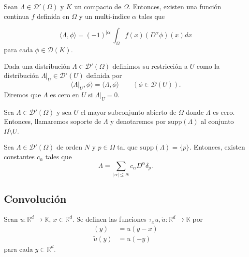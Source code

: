\begin{teorema}
Sean $\Lambda\in \mathcal{D}'(\Omega)$ y $K$ un compacto de $\Omega$. Entonces, existen una función continua $f$ definida en $\Omega$ y un multi-índice $\alpha$ tales que 

\begin{equation}
\langle \Lambda , \phi\rangle = (-1)^{\vert\alpha\vert} \int_{\Omega}f(x)(D^{\alpha}\phi )(x)dx
\end{equation}
para cada $\phi\in \mathcal{D}(K)$.
\end{teorema}

\begin{definicion}
Dada una distribución $\Lambda\in\mathcal{D}'(\Omega)$ definimos su restricción a $U$ como la distribución  $\Lambda|_{U}\in\mathcal{D}'(U)$ definida por 
\begin{equation}
\langle\Lambda |_{U},\phi\rangle = \langle \Lambda, \phi\rangle \qquad (\phi \in \mathcal{D}(U)).
\end{equation}
Diremos que $\Lambda$ es cero en $U$ si $\Lambda |_{U} = 0$.
\end{definicion}

\begin{definicion}
Sea $\Lambda\in\mathcal{D}'(\Omega)$ y sea $U$ el mayor subconjunto abierto de $\Omega$ donde $\Lambda$ es cero. Entonces, llamaremos soporte de $\Lambda$ y denotaremos por  $\mathrm{supp}({\Lambda})$ al conjunto $\Omega\setminus U$.

\end{definicion}

\begin{teorema}\label{thm:d02}
Sea $\Lambda\in \mathcal{D}'(\Omega)$ de orden $N$ y $p\in\Omega$ tal que $\mathrm{supp}({\Lambda}) = \{p\} $. Entonces, existen constantes $c_{\alpha}$ tales que 
\begin{equation}
\Lambda = \sum_{\vert\alpha\vert \leq N} c_{\alpha} D^{\alpha}\delta_{p}.
\end{equation}
\end{teorema}
\subsection{Convolución}
\begin{definicion}
Sean $u:\mathds{R}^{d}\rightarrow \mathds{K}$, $x\in\mathds{R}^{d}$. Se definen las funciones $\tau_{x} u , \check{u}:\mathds{R}^{d}\rightarrow \mathds{K} $ por
\begin{align}
[\tau_{x} u ](y) & = u (y-x)\\
 \check{u}(y) & = u(-y) 
\end{align}
para cada $y\in\mathds{R}^{d}$.
\end{definicion}

